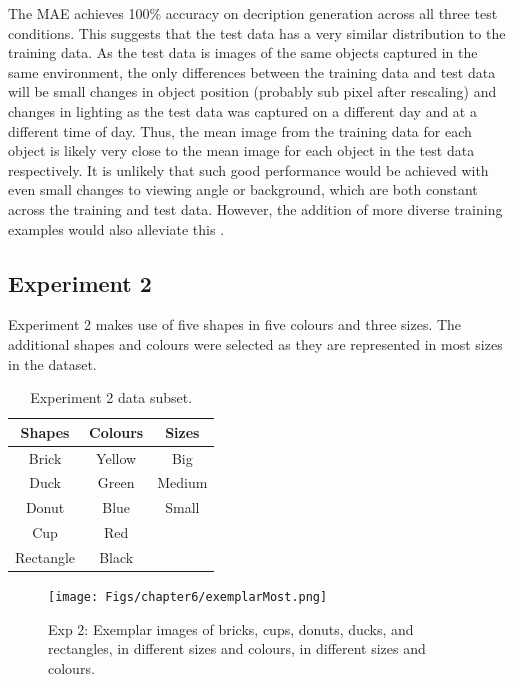The MAE achieves 100\% accuracy on decription generation across all three test conditions. This suggests that the test data has a very similar distribution to the training data. As the test data is images of the same objects captured in the same environment, the only differences between the training data and test data will be small changes in object position (probably sub pixel after rescaling) and  changes in lighting as the test data was captured on a different day and at a different time of day. Thus, the mean image from the training data for each object is likely very close to the mean image for each object in the test data respectively. It is unlikely that such good performance would be achieved with even small changes to viewing angle or background, which are both constant across the training and test data. However, the addition of more diverse training examples would also alleviate this \cite{keller2016analysis, keller}.

\subsection{Experiment 2}

Experiment 2 makes use of five shapes in five colours and three sizes. The additional shapes and colours were selected as they are represented in most sizes in the dataset.

\begin{table}[h]
\centering
\begin{tabular}{|c|c|c|}
\hline

\textbf{Shapes}  & \textbf{Colours} & \textbf{Sizes}\\ \hline \hline
Brick  & Yellow  & Big \\ \hline
Duck   & Green   & Medium \\ \hline
Donut & Blue & Small \\ \hline
Cup  & Red & \\ \hline
Rectangle & Black & \\ \hline

\end{tabular}
\caption{Experiment 2 data subset.}
\label{tab:6_exp2_data} 
\end{table}

\begin{figure}[ht]
    \centering
    \texttt{[image: Figs/chapter6/exemplarMost.png]}
    \caption{Exp 2: Exemplar images of bricks, cups, donuts, ducks, and rectangles, in different sizes and colours, in different sizes and colours.}
    \label{fig:ExmMost}
\end{figure}


